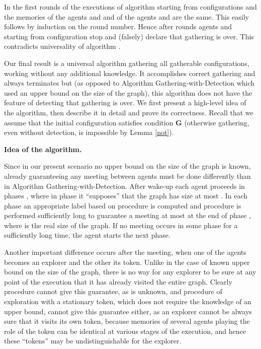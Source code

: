 \documentclass[11pt]{article}
\newcommand{\qed}{\hfill  \bigbreak}
\newenvironment{proof}{\noindent {\bf Proof.}}{\qed}
\begin{document}
\begin{proof}
In the first  rounds of the executions of algorithm  starting from configurations  and  the memories of the agents  and  and
of the agents  and  are 
the same. This easily follows by induction on the round number. Hence after  rounds agents  and  starting from configuration   stop and (falsely)
declare that gathering is over. This contradicts universality of algorithm .
\end{proof}

Our final result is a universal algorithm gathering all gatherable configurations, working without any additional knowledge. It accomplishes correct gathering
and always terminates but (as opposed to Algorithm Gathering-with-Detection which used an upper bound on the size of the graph), this algorithm does not
have the feature of detecting that gathering is over. We first present a high-level idea of the algorithm, then describe it in detail and prove its correctness.
Recall that we assume that the initial configuration satisfies condition {\bf G} (otherwise gathering, even without detection,  is impossible by Lemma \ref{not}).

 \vspace*{0.2cm}

\noindent
{\bf Idea of the algorithm.}

Since in our present scenario no upper bound on the size of the graph is known, already guaranteeing any meeting between agents must be done 
differently than in Algorithm Gathering-with-Detection. After wake-up each agent proceeds in phases {}, where in phase  it ``supposes'' that the graph
has size at most .  In each phase an appropriate label based on procedure  is computed and procedure  is performed sufficiently long to guarantee
a meeting at most at the end of phase {}, where  is the real size of the graph. If no meeting occurs in some phase for a sufficiently long time, the agent starts the next phase.

Another important difference occurs after the meeting, when one of the agents becomes an explorer and the other its token.  Unlike in the case of known upper bound
on the size of the graph, 
there is no way for any explorer to be sure at any point of the execution that it has already visited the entire graph. Clearly procedure  cannot give this guarantee, as  is unknown, and procedure  of exploration with a stationary token, which does not require the knowledge of an upper bound, cannot give this guarantee either, as an explorer cannot be always sure that it visits its own token, because memories of several agents playing the role of the token can be 
identical at various stages of the execution, and hence these ``tokens'' may be undistinguishable for the explorer. 
\end{document}
